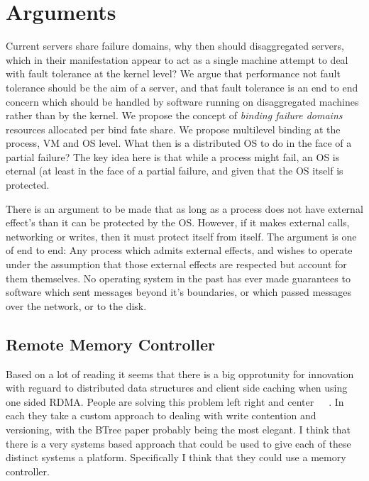\section{Arguments}
\label{sec:arguments}

Current servers share failure domains, why then should disaggregated servers, which
in their manifestation appear to act as a single machine attempt to deal with
fault tolerance at the kernel level? We argue that performance not fault
tolerance should be the aim of a server, and that fault tolerance is an end to
end concern which should be handled by software running on disaggregated
machines rather than by the kernel. We propose the concept of \textit{binding
failure domains} resources allocated per bind fate share. We propose multilevel
binding at the process, VM and OS level. What then is a distributed OS to do in
the face of a partial failure? The key idea here is that while a process might fail, an OS is eternal (at least in the face of a partial failure, and given that the OS itself is protected.

There is an argument to be made that as long as a process does not have
external effect's than it can be protected by the OS. However, if it makes
external calls, networking or writes, then it must protect itself from itself.
The argument is one of end to end: Any process which admits external effects,
and wishes to operate under the assumption that those external effects are
respected but account for them themselves. No operating system in the past has
ever made guarantees to software which sent messages beyond it's boundaries, or
which passed messages over the network, or to the disk.

\subsection{Remote Memory Controller}

Based on a lot of reading it seems that there is a big opprotunity for
innovation with reguard to distributed data structures and client side
caching when using one sided RDMA. People are solving this problem left right
and center~\cite{cell}~\cite{serf}~\cite{aguilera2019designing}. In each they
take a custom approach to dealing with write contention and versioning, with
the BTree paper probably being the most elegant. I think that there is a very
systems based approach that could be used to give each of these distinct
systems a platform. Specifically I think that they could use a memory
controller.

